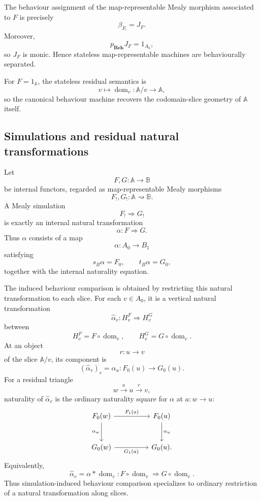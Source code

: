 The behaviour assignment of the map-representable Mealy morphism associated to
\(F\) is precisely
\[
    \beta_{F_!}=J_F.
\]
Moreover,
\[
    p_{\mathbf{Beh}}J_F=1_{A_0},
\]
so \(J_F\) is monic. Hence stateless map-representable machines are
behaviourally separated.

For \(F=1_{\mathbb A}\), the stateless residual semantics is
\[
    v\longmapsto
    \operatorname{dom}_v:\mathbb A/v\to\mathbb A,
\]
so the canonical behaviour machine recovers the codomain-slice geometry of
\(\mathbb A\) itself.

\subsection{Simulations and residual natural transformations}
\label{subsec:stateless-simulations-specialization}

Let
\[
    F,G:\mathbb A\to\mathbb B
\]
be internal functors, regarded as map-representable Mealy morphisms
\[
    F_!,G_!:\mathbb A\rightsquigarrow\mathbb B.
\]
A Mealy simulation
\[
    F_!\Rightarrow G_!
\]
is exactly an internal natural transformation
\[
    \alpha:F\Rightarrow G.
\]
Thus \(\alpha\) consists of a map
\[
    \alpha:A_0\to B_1
\]
satisfying
\[
    s_B\alpha=F_0,
    \qquad
    t_B\alpha=G_0,
\]
together with the internal naturality equation.

The induced behaviour comparison is obtained by restricting this natural
transformation to each slice. For each \(v\in A_0\), it is a vertical natural
transformation
\[
    \widehat{\alpha}_v:
    H^F_v\Rightarrow H^G_v
\]
between
\[
    H^F_v=F\circ\operatorname{dom}_v,
    \qquad
    H^G_v=G\circ\operatorname{dom}_v.
\]
At an object
\[
    r:u\to v
\]
of the slice \(\mathbb A/v\), its component is
\[
    (\widehat{\alpha}_v)_r
    =
    \alpha_u:F_0(u)\to G_0(u).
\]
For a residual triangle
\[
    w\xrightarrow{a}u\xrightarrow{r}v,
\]
naturality of \(\widehat{\alpha}_v\) is the ordinary naturality square for
\(\alpha\) at \(a:w\to u\):
\[
    \begin{tikzcd}[column sep=huge, row sep=large]
            F_0(w)
                \arrow[r, "F_1(a)"]
                \arrow[d, "\alpha_w"']
        &
            F_0(u)
                \arrow[d, "\alpha_u"]
        \\
            G_0(w)
                \arrow[r, "G_1(a)"']
        &
            G_0(u).
    \end{tikzcd}
\]
Equivalently,
\[
    \widehat{\alpha}_v
    =
    \alpha\ast\operatorname{dom}_v:
    F\circ\operatorname{dom}_v
        \Rightarrow
    G\circ\operatorname{dom}_v.
\]
Thus simulation-induced behaviour comparison specializes to ordinary
restriction of a natural transformation along slices.

